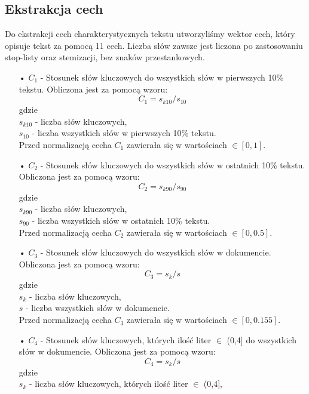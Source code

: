 \documentclass{classrep}
\begin{document}
\subsection{Ekstrakcja cech}
Do ekstrakcji cech charakterystycznych tekstu utworzyliśmy wektor cech, który opisuje tekst za pomocą 11 cech. Liczba słów zawsze jest liczona po zastosowaniu stop-listy oraz stemizacji, bez znaków przestankowych.
\begin{itemize}
\item[•] $C_1$ - Stosunek słów kluczowych do wszystkich słów w pierwszych 10\% tekstu. Obliczona jest za pomocą wzoru:
\begin{equation} C_1 = s_{k10} / s_{10}  \end{equation} gdzie \\
$s_{k10}$ - liczba słów kluczowych, \\
$s_{10}$ - liczba wszystkich słów w pierwszych 10\% tekstu. \\
Przed normalizacją cecha $C_{1}$ zawierała się w wartościach $\in [0,1]$.
\item[•] $C_2$ - Stosunek słów kluczowych do wszystkich słów w ostatnich 10\% tekstu. Obliczona jest za pomocą wzoru:
\begin{equation} C_2 = s_{k90} / s_{90}  \end{equation} gdzie \\
$s_{k90}$ - liczba słów kluczowych, \\
$s_{90}$ - liczba wszystkich słów w ostatnich 10\% tekstu.\\
Przed normalizacją cecha $C_{2}$ zawierała się w wartościach $\in [0,0.5]$.
\item[•] $C_3$ - Stosunek słów kluczowych do wszystkich słów w dokumencie. Obliczona jest za pomocą wzoru:
\begin{equation} C_3 = s_k / s  \end{equation} gdzie \\
$s_k$ - liczba słów kluczowych,\\
$s$ - liczba wszystkich słów w dokumencie. \\
Przed normalizacją cecha $C_{3}$ zawierała się w wartościach $\in [0,0.155]$.
\item[•] $C_4$ - Stosunek słów kluczowych, których ilość liter $\in$ (0,4] do wszystkich słów w dokumencie. Obliczona jest za pomocą wzoru:
\begin{equation} C_4 = s_k / s  \end{equation} gdzie \\
$s_k$ - liczba słów kluczowych, których ilość liter $\in$ (0,4], \\

\end{itemize}
\end{document}
